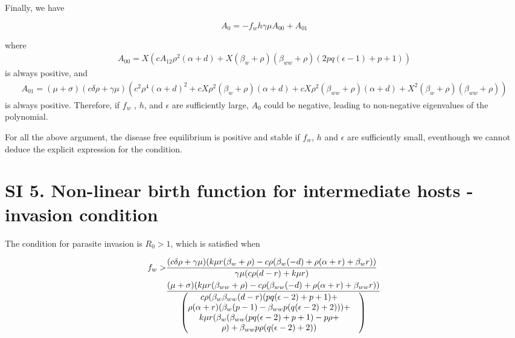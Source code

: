 \documentclass[11pt]{article}
\begin{document}
Finally, we have

\begin{equation}
	A_0 = -f_w h \gamma \mu A_{00} + A_{01}
\end{equation}

where 
\begin{align}
	A_{00} = X (c A_{12} \rho ^2 (\alpha +d) + X (\beta_w+\rho ) (\beta_{ww}+\rho ) (2 p q (\epsilon -1)+p+1))
\end{align}
is always positive, and
\begin{align}
	A_{01} = (\mu +\sigma ) (c \delta  \rho +\gamma  \mu ) (c^2 \rho ^4 (\alpha +d)^2+c X \rho ^2 (\beta_w+\rho ) (\alpha +d)+c X \rho ^2 (\beta_{ww}+\rho ) (\alpha +d)+X^2 (\beta_w+\rho ) (\beta_{ww}+\rho ))
\end{align}
is always positive. Therefore, if $f_w$ , $h$, and $\epsilon$ are sufficiently large, $A_0$ could be negative, leading to non-negative eigenvalues of the polynomial.

For all the above argument, the disease free equilibrium is positive and stable if $f_w$, $h$ and $\epsilon$ are sufficiently small, eventhough we cannot deduce the explicit expression for the condition.

\section*{SI 5. Non-linear birth function for intermediate hosts - invasion condition}

The condition for parasite invasion is $R_0 > 1$, which is satisfied when

\begin{align}
	f_w > & \frac{(c \delta  \rho +\gamma  \mu ) (k \mu  r (\beta_w+\rho )-c \rho  (\beta_w (-d)+\rho  (\alpha +r)+\beta_w r))}{\gamma  \mu  (c \rho  (d-r)+k \mu  r)} \notag \\
	& \frac{(\mu +\sigma ) (k \mu  r (\beta_{ww}+\rho )-c \rho  (\beta_{ww} (-d)+\rho  (\alpha +r)+\beta_{ww} r))}{ \begin{pmatrix} c \rho  (\beta_w \beta_{ww} (d-r) (p q (\epsilon -2)+p+1) + & \\ 
			\rho  (\alpha +r) (\beta_w (p-1)-\beta_{ww} p (q (\epsilon -2)+2))) + & \\
			 k \mu  r (\beta_w (\beta_{ww} (p q (\epsilon -2)+p+1)-p \rho + & \\
			 \rho )+\beta_{ww} p \rho  (q (\epsilon -2)+2)) \end{pmatrix}}
\end{align}
\end{document}
